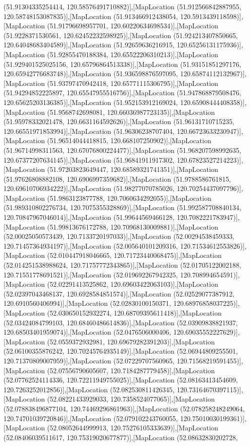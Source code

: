 (51.91304335254414, 120.58576491710882)],[MapLocation (51.912566842887955, 120.58748153087835)],[MapLocation (51.913466912438054, 120.5913439118598)],[MapLocation (51.91796698957701, 120.60220634698534)],[MapLocation (51.9228371530561, 120.62452232598925)],[MapLocation (51.924213407850665, 120.64048683404589)],[MapLocation (51.92659636216915, 120.65256131175936)],[MapLocation (51.92855470188384, 120.65522206310213)],[MapLocation (51.929401525025156, 120.65796864513338)],[MapLocation (51.93151851297176, 120.65942776683748)],[MapLocation (51.936598876597095, 120.65874112132967)],[MapLocation (51.93797470942418, 120.65771115306795)],[MapLocation (51.94294852225897, 120.65547955516756)],[MapLocation (51.947868879508476, 120.65625203136385)],[MapLocation (51.952153912169024, 120.65908444408358)],[MapLocation (51.9568742698081, 120.66036987723135)],[MapLocation (51.95978332021478, 120.6631164592626)],[MapLocation (51.96131710715235, 120.66551971853994)],[MapLocation (51.96306238707404, 120.66723633230947)],[MapLocation (51.96514044418815, 120.668107250902)],[MapLocation (51.96714998311563, 120.67076800224477)],[MapLocation (51.968207598992635, 120.67377207634145)],[MapLocation (51.96841911917302, 120.67823527214223)],[MapLocation (51.97203823649447, 120.68589321741351)],[MapLocation (51.97626808882108, 120.6906997359682)],[MapLocation (51.9788586761815, 120.69610706934222)],[MapLocation (51.98277070785026, 120.70254437097796)],[MapLocation (51.9863123877788, 120.7060634292055)],[MapLocation (51.989310802276734, 120.7075355328869)],[MapLocation (51.992587708840134, 120.70847967046014)],[MapLocation (51.99644569466128, 120.7082221783947)],[MapLocation (51.99813676172788, 120.70968130009881)],[MapLocation (52.00025050573439, 120.7133720197033)],[MapLocation (52.00294538459333, 120.71457364934197)],[MapLocation (52.005640101209316, 120.71534612553826)],[MapLocation (52.010447918046665, 120.71723440068475)],[MapLocation (52.014251538988624, 120.71757772343865)],[MapLocation (52.01705122002188, 120.71551778691521)],[MapLocation (52.019692267942325, 120.708994654591)],[MapLocation (52.02291413525862, 120.69603422063103)],[MapLocation (52.02397043468137, 120.6928584851574)],[MapLocation (52.02529077387912, 120.6910560406994)],[MapLocation (52.02830100150371, 120.68976858037225)],[MapLocation (52.030650152932274, 120.68709395611418)],[MapLocation (52.03424084799103, 120.68460486614836)],[MapLocation (52.03909838821937, 120.68503401959074)],[MapLocation (52.0476506000406, 120.69035552227629)],[MapLocation (52.0559372932981, 120.69679282391203)],[MapLocation (52.06100355876242, 120.70245764935149)],[MapLocation (52.06944809255501, 120.71370809007959)],[MapLocation (52.07229707560965, 120.71568219591455)],[MapLocation (52.07556790605607, 120.7184287779458)],[MapLocation (52.07762524114336, 120.72211949755025)],[MapLocation (52.08163413454609, 120.7263252012856)],[MapLocation (52.082530811426345, 120.73164670397115)],[MapLocation (52.08221433929033, 120.7358524077065)],[MapLocation (52.078838496877104, 120.74469296861963)],[MapLocation (52.078258248249064, 120.74701039720846)],[MapLocation (52.079102243760055, 120.75010030199361)],[MapLocation (52.08052644999913, 120.75276105333639)],[MapLocation (52.08406039511617, 120.75319020677877)],[MapLocation (52.08632830202728, 